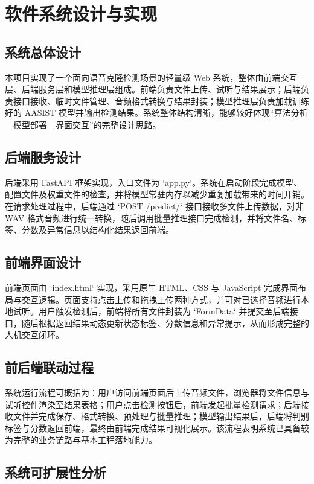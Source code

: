 \documentclass{xduugthesis}
\begin{document}
\chapter{软件系统设计与实现}

\section{系统总体设计}

本项目实现了一个面向语音克隆检测场景的轻量级 Web 系统，整体由前端交互层、后端服务层和模型推理层组成。前端负责文件上传、试听与结果展示；后端负责接口接收、临时文件管理、音频格式转换与结果封装；模型推理层负责加载训练好的 AASIST 模型并输出检测结果。系统整体结构清晰，能够较好体现“算法分析—模型部署—界面交互”的完整设计思路。

\section{后端服务设计}

后端采用 FastAPI 框架实现，入口文件为 `app.py`。系统在启动阶段完成模型、配置文件及权重文件的检查，并将模型常驻内存以减少重复加载带来的时间开销。在请求处理过程中，后端通过 `POST /predict/` 接口接收多文件上传数据，对非 WAV 格式音频进行统一转换，随后调用批量推理接口完成检测，并将文件名、标签、分数及异常信息以结构化结果返回前端。

\section{前端界面设计}

前端页面由 `index.html` 实现，采用原生 HTML、CSS 与 JavaScript 完成界面布局与交互逻辑。页面支持点击上传和拖拽上传两种方式，并可对已选择音频进行本地试听。用户触发检测后，前端将所有文件封装为 `FormData` 并提交至后端接口，随后根据返回结果动态更新状态标签、分数信息和异常提示，从而形成完整的人机交互闭环。

\section{前后端联动过程}

系统运行流程可概括为：用户访问前端页面后上传音频文件，浏览器将文件信息与试听控件渲染至结果表格；用户点击检测按钮后，前端发起批量检测请求；后端接收文件并完成保存、格式转换、预处理与批量推理；模型输出结果后，后端将判别标签与分数返回前端，最终由前端完成结果可视化展示。该流程表明系统已具备较为完整的业务链路与基本工程落地能力。

\section{系统可扩展性分析}
\end{document}
